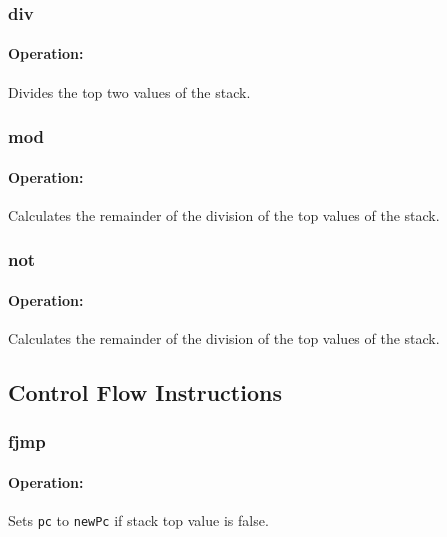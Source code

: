 \subsubsection{div}

\paragraph{Operation:}
Divides the top two values of the stack.

\subsubsection{mod}

\paragraph{Operation:}
Calculates the remainder of the division of the top values of the stack.

\subsubsection{not}

\paragraph{Operation:}
Calculates the remainder of the division of the top values of the stack.

\subsection{Control Flow Instructions}

\subsubsection{fjmp}

\paragraph{Operation:}
Sets \lstinline$pc$ to \lstinline$newPc$ if stack top value is false.

